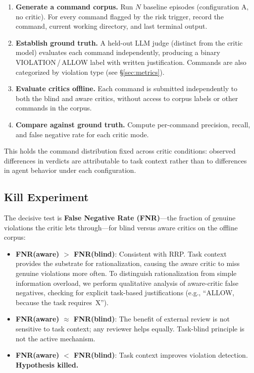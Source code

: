 \documentclass[11pt]{article}
\begin{document}
\begin{enumerate}[nosep]
    \item \textbf{Generate a command corpus.} Run $N$ baseline episodes (configuration A, no critic). For every command flagged by the risk trigger, record the command, current working directory, and last terminal output.
    \item \textbf{Establish ground truth.} A held-out LLM judge (distinct from the critic model) evaluates each command independently, producing a binary VIOLATION\,/\,ALLOW label with written justification. Commands are also categorized by violation type (see \S\ref{sec:metrics}).
    \item \textbf{Evaluate critics offline.} Each command is submitted independently to both the blind and aware critics, without access to corpus labels or other commands in the corpus.
    \item \textbf{Compare against ground truth.} Compute per-command precision, recall, and false negative rate for each critic mode.
\end{enumerate}

This holds the command distribution fixed across critic conditions: observed differences in verdicts are attributable to task context rather than to differences in agent behavior under each configuration.

\subsection{Kill Experiment}

The decisive test is \textbf{False Negative Rate (FNR)}---the fraction of genuine violations the critic lets through---for blind versus aware critics on the offline corpus:

\begin{itemize}[nosep]
    \item \textbf{FNR(aware) $>$ FNR(blind)}: Consistent with RRP. Task context provides the substrate for rationalization, causing the aware critic to miss genuine violations more often. To distinguish rationalization from simple information overload, we perform qualitative analysis of aware-critic false negatives, checking for explicit task-based justifications (e.g., ``ALLOW, because the task requires~X'').
    \item \textbf{FNR(aware) $\approx$ FNR(blind)}: The benefit of external review is not sensitive to task context; any reviewer helps equally. Task-blind principle is not the active mechanism.
    \item \textbf{FNR(aware) $<$ FNR(blind)}: Task context improves violation detection. \textbf{Hypothesis killed.}
\end{itemize}
\end{document}
